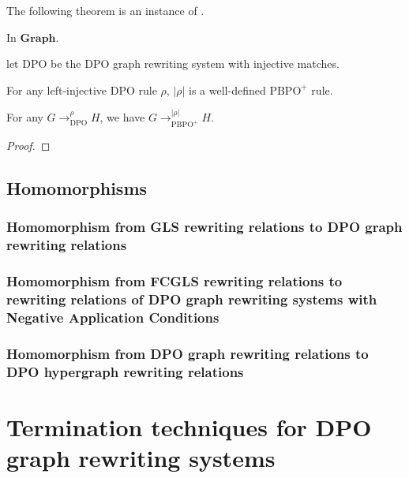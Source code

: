 \documentclass{book}
\begin{document}
        The following theorem is an instance of \cite[Theorem 72]{overbeek2023pbpo_JLAMP}.
        \begin{theorem}
            In $\mathbf{Graph}$.
            
            let $\mathrm{DPO}$ be the DPO graph rewriting system with injective matches.
        
            For any left-injective DPO rule $\rho$, $|\rho|$ is a well-defined $\mathrm{PBPO}^+$ rule. 
            
            For any $G \to^{\rho}_{\mathrm{DPO}} H$, we have $G \to^{|\rho|}_{\mathrm{PBPO}^+} H$.  
        \end{theorem}
        \begin{proof}
        \end{proof}
        
\chapter{Homomorphisms}

    \section{Homomorphism from GLS rewriting relations to DPO graph rewriting relations}
    \label{sec:morphism_from_gls_to_dpo_grs}
    
    \section{Homomorphism from FCGLS rewriting relations to rewriting relations of DPO graph rewriting systems with Negative Application Conditions}
    \label{sec:morphism_from_pgls_to_nac_dpo_grs}
    
    \section{Homomorphism from DPO graph rewriting relations to DPO hypergraph rewriting relations}
    \label{sec:morphism_from_dpo_grs_to_hypergraph}
    

\part{Termination techniques for DPO graph rewriting systems}
\end{document}
